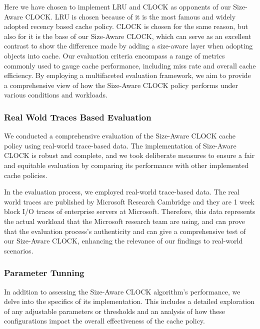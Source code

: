 \documentclass[conference]{IEEEtran}
\begin{document}
Here we have chosen to implement LRU and CLOCK as opponents of our Size-Aware CLOCK. LRU is chosen because of it is the most famous and widely adopted recency based cache policy. CLOCK is chosen for the same reason, but also for it is the base of our Size-Aware CLOCK, which can serve as an excellent contrast to show the difference made by adding a size-aware layer when adopting objects into cache. Our evaluation criteria encompass a range of metrics commonly used to gauge cache performance, including miss rate and overall cache efficiency. By employing a multifaceted evaluation framework, we aim to provide a comprehensive view of how the Size-Aware CLOCK policy performs under various conditions and workloads.

\subsubsection{Real Wold Traces Based Evaluation}
We conducted a comprehensive evaluation of the Size-Aware CLOCK cache policy using real-world trace-based data. The implementation of Size-Aware CLOCK is robust and complete, and we took deliberate measures to ensure a fair and equitable evaluation by comparing its performance with other implemented cache policies.

In the evaluation process, we employed real-world trace-based data. The real world traces are published by Microsoft Research Cambridge and they are 1 week block I/O traces of enterprise servers at Microsoft. Therefore, this data represents the actual workload that the Microsoft research team are using, and can prove that the evaluation process's authenticity and can give a comprehensive test of our Size-Aware CLOCK, enhancing the relevance of our findings to real-world scenarios.

\subsubsection{Parameter Tunning}
In addition to assessing the Size-Aware CLOCK algorithm's performance, we delve into the specifics of its implementation. This includes a detailed exploration of any adjustable parameters or thresholds and an analysis of how these configurations impact the overall effectiveness of the cache policy.

\end{document}
